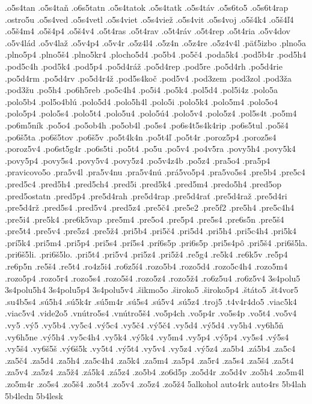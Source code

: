 {.o5s4tan
.o5s4taň
.o6s5tatn
.o5s4tatok
.o5s4tatk
.o5s4táv
.o5s6to5
.o5s6t4rap
.ostro5u
.o5s4ved
.o5s4vetl
.o5s4viet
.o5s4viež
.o5s4vit
.o5s4voj
.o5š4k4
.o5š4ľ4
.o5š4m4
.o5š4p4
.o5š4v4
.o5t4ras
.o5t4rav
.o5t4ráv
.o5t4rep
.o5t4ria
.o5v4dov
.o5v4lád
.o5v4laž
.o5v4p4
.o5v4r
.o5z4l4
.o5z4n
.o5z4re
.o5z4v4l
.päť5izbo
.plno5a
.plno5p4
.plno5š4
.plno5kr4
.plocho5d4
.po5b4
.po5č4
.poda5k4
.pod5b4r
.pod5h4
.pod5c4h
.pod5k4
.pod5p4
.po5d4ráž
.po5d4rep
.pod5re
.po5d4rh
.po5d4rie
.po5d4rm
.po5d4rv
.po5d4r4ž
.pod5s4koč
.pod5v4
.pod3zem
.pod3zol
.pod3ža
.pod3žu
.po5h4
.po6h5reb
.po5c4h4
.po5i4
.po5k4
.pol5d4
.pol5i4z
.polo5a
.polo5b4
.pol5o4blú
.polo5d4
.polo5h4l
.polo5i
.polo5k4
.polo5m4
.polo5o4
.polo5p4
.polo5s4
.polo5t4
.polo5u4
.polo5ú4
.polo5v4
.polo5z4
.pol5s4t
.po5m4
.po6m5ník
.po5o4
.po5ob4h
.po5ob4l
.po5s4
.po6s4t5s4k4rip
.po6s5tul
.po5š4
.po6š5ta
.po6š5tov
.po6š5v
.po5t4k4n
.po5t4ľ
.po5t4r
.poroz5p4
.poroz5s4
.poroz5v4
.po6st5g4r
.po6s5ti
.po5t4
.po5u
.po5v4
.po4v5ra
.povy5h4
.povy5k4
.povy5p4
.povy5s4
.povy5v4
.povy5z4
.po5v4z4b
.po5z4
.pra5o4
.pra5p4
.pravicovo5o
.pra5v4l
.pra5v4nu
.pra5v4nú
.prá5vo5p4
.pra5vo5s4
.pre5b4
.pre5c4
.pred5c4
.pred5h4
.pred5ch4
.pred5i
.pred5k4
.pred5m4
.predo5h4
.pred5op
.pred5ostatn
.pred5p4
.pre5d4rah
.pre5d4rap
.pre5d4rať
.pre5d4raž
.pre5d4ri
.pre5d4rž
.pred5s4
.pred5v4
.pred5z4
.pre5č4
.pre5e2
.pre5f2
.pre5h4
.pre5c4h4
.pre5i4
.pre5k4
.pre6k5vap
.pre5m4
.pre5o4
.pre5p4
.pre5s4
.pre6s5n
.pre5š4
.pre5t4
.pre5v4
.pre5z4
.pre5ž4
.pri5b4
.pri5č4
.pri5d4
.pri5h4
.pri5c4h4
.pri5k4
.prí5k4
.pri5m4
.pri5p4
.pri5s4
.prí5s4
.prí6s5p
.pri6s5p
.pri5s4pô
.pri5š4
.pri6š5la.
.pri6š5li.
.pri6š5lo.
.pri5t4
.pri5v4
.pri5z4
.pri5ž4
.re5g4
.re5k4
.re6k5v
.re5p4
.re6p5n
.re5š4
.re5t4
.ro4z5i4
.ro6z5í4
.rozo5b4
.rozo5d4
.rozo5c4h4
.rozo5m4
.rozo5p4
.rozo5r4
.rozo5s4
.rozo5š4
.rozo5z4
.rozo5ž4
.ro6z5u4
.ro6z5v4
3s4polu5
3s4polu5h4
3s4polu5p4
3s4polu5v4
.šikmo5o
.široko5
.široko5p4
.štáto5
.št4vor5
.su4b5s4
.sú5h4
.sú5k4r
.sú5m4r
.sú5s4
.sú5v4
.sú5z4
.troj5
.t4v4r4do5
.viac5k4
.viac5v4
.vide2o5
.vnútro5s4
.vnútro5š4
.vo5p4ch
.vo5p4r
.vo5s4p
.vo5t4
.vo5v4
.vy5
.vý5
.vy5b4
.vy5c4
.vý5c4
.vy5č4
.vý5č4
.vy5d4
.vý5d4
.vy5h4
.vy6h5ň
.vy6h5ne
.vý5h4
.vy5c4h4
.vy5k4
.vý5k4
.vy5m4
.vy5p4
.vý5p4
.vy5s4
.vý5s4
.vy5š4
.vy6š5š
.vý6š5k
.vy5t4
.vý5t4
.vy5v4
.vy5z4
.vý5z4
.za5b4
.zá5b4
.za5c4
.za5č4
.za5d4
.za5h4
.za5c4h4
.za5k4
.za5m4
.za5p4
.za5r4
.za5s4
.za5š4
.za5t4
.za5v4
.za5z4
.za5ž4
.zá5k4
.zá5z4
.zo5b4
.zo6d5p
.zo5d4r
.zo5d4v
.zo5h4
.zo5m4l
.zo5m4r
.zo5s4
.zo5š4
.zo5t4
.zo5v4
.zo5z4
.zo5ž4
5alkohol
auto4rk
auto4rs
5b4lah
5b4ledn
5b4lesk
}
